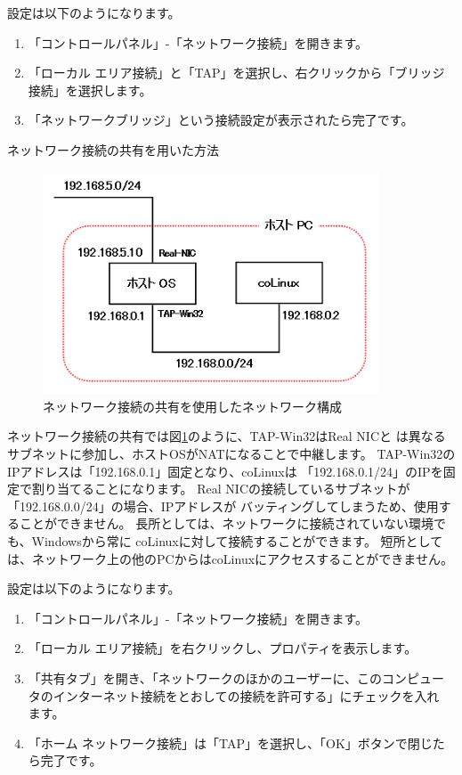 \documentclass[mingoth,a4paper]{jsarticle}
\begin{document}
設定は以下のようになります。
\begin{enumerate}
\item 「コントロールパネル」-「ネットワーク接続」を開きます。
\item 「ローカル エリア接続」と「TAP」を選択し、右クリックから「ブリッジ接続」を選択します。
\item 「ネットワークブリッジ」という接続設定が表示されたら完了です。
\end{enumerate}

ネットワーク接続の共有を用いた方法

\begin{figure}[htbp]
 \begin{center}
  \includegraphics[width=100mm]{image200804/colinux_ics.png}
 \end{center}
 \caption{ネットワーク接続の共有を使用したネットワーク構成}
 \label{fig:ics}
\end{figure}

ネットワーク接続の共有では図\ref{fig:ics}のように、TAP-Win32はReal NICと
は異なるサブネットに参加し、ホストOSがNATになることで中継します。
TAP-Win32のIPアドレスは「192.168.0.1」固定となり、coLinuxは
「192.168.0.1/24」のIPを固定で割り当てることになります。
Real NICの接続しているサブネットが「192.168.0.0/24」の場合、IPアドレスが
バッティングしてしまうため、使用することができません。
長所としては、ネットワークに接続されていない環境でも、Windowsから常に
coLinuxに対して接続することができます。
短所としては、ネットワーク上の他のPCからはcoLinuxにアクセスすることができません。

設定は以下のようになります。
\begin{enumerate}
\item 「コントロールパネル」-「ネットワーク接続」を開きます。
\item 「ローカル エリア接続」を右クリックし、プロパティを表示します。
\item 「共有タブ」を開き、「ネットワークのほかのユーザーに、このコンピュー
      タのインターネット接続をとおしての接続を許可する」にチェックを入れ
      ます。
\item 「ホーム ネットワーク接続」は「TAP」を選択し、「OK」ボタンで閉じたら完了です。
\end{enumerate}
\end{document}
